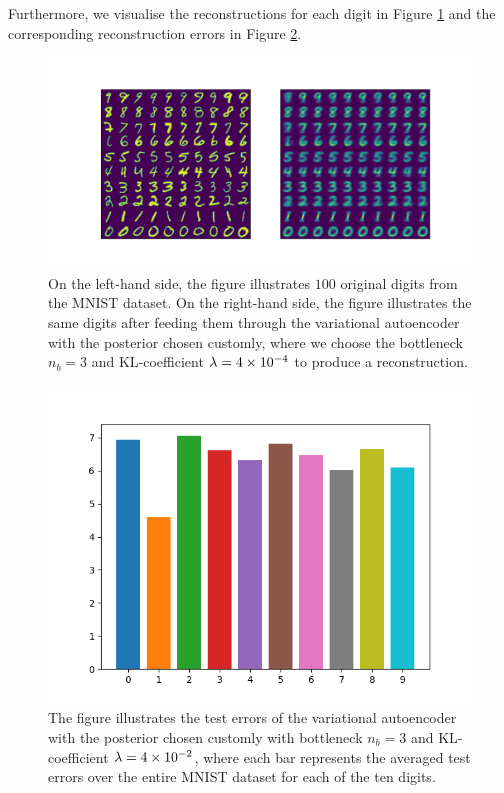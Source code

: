 Furthermore, we visualise the reconstructions for each digit in Figure \ref{fig:convolutional_VAE_new_idea_KL_4e-2_10k_epochs_3D_inference} and the corresponding reconstruction errors in Figure \ref{fig:convolutional_VAE_new_idea_KL_4e-2_10k_epochs_3D_errors}.


\begin{figure}
\begin{center}
      \includegraphics[trim = 15mm 10mm 15mm 15mm, clip, width=\linewidth]{convolutional_VAE_new_idea_KL_4e-2_10k_epochs_3D_inference}
\end{center}
\caption{On the left-hand side, the figure illustrates $100$ original digits from the MNIST dataset. On the right-hand side, the figure illustrates the same digits after feeding them through the variational autoencoder with the posterior chosen customly, where we choose the bottleneck $n_b=3$ and KL-coefficient $\lambda = \num{4e-4}$ to produce a reconstruction.}\label{fig:convolutional_VAE_new_idea_KL_4e-2_10k_epochs_3D_inference}
\end{figure}


\begin{figure}
\begin{center}
      \includegraphics[width=0.55\linewidth]{convolutional_VAE_new_idea_KL_4e-2_10k_epochs_3D_errors}
\end{center}
\caption{The figure illustrates the test errors of the variational autoencoder with the posterior chosen customly with bottleneck $n_b=3$ and KL-coefficient $\lambda = \num{4e-2}$, where each bar represents the averaged test errors over the entire MNIST dataset for each of the ten digits.}\label{fig:convolutional_VAE_new_idea_KL_4e-2_10k_epochs_3D_errors}
\end{figure}


